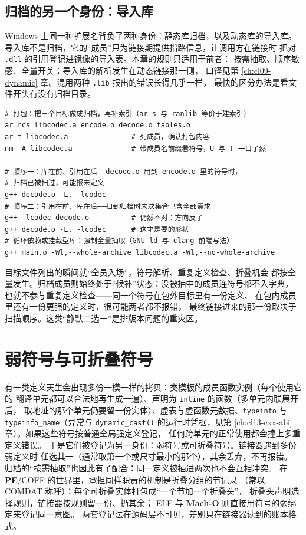\documentclass[12pt,a4paper,fontset=fandol]{ctexbook}
\newcommand{\Fn}[1]{\texttt{#1()}}
\newcommand{\Tp}[1]{\texttt{#1}}
\newcommand{\Sw}[1]{\texttt{#1}}
\newcommand{\Mx}[1]{\textsf{#1}}
\newcommand{\PeFmt}{\textbf{\textsf{PE}}}
\newcommand{\Macho}{\textbf{\textsf{Mach-O}}}
\newcommand{\Win}{\textsf{Windows}}
\begin{document}
\subsection{归档的另一个身份：导入库}\label{sec:cl08-importlib}

\Win{} 上同一种扩展名背负了两种身份：静态库归档，以及动态库的导入库。
导入库不是归档，它的“成员”只为链接期提供指路信息，让调用方在链接时
把对 \Tp{.dll} 的引用登记进镜像的导入表。本章的规则只适用于前者：
按需抽取、顺序敏感、全量开关；导入库的解析发生在动态链接那一侧，
口径见第 \ref{ch:cl09-dynamic} 章。混用两种 \Tp{.lib} 报出的错误长得几乎一样，
最快的区分办法是看文件开头有没有归档目录。

\begin{lstlisting}[style=shellstyle, caption={归档的创建与两种链接顺序（示意流程）}]
# 打包：把三个目标做成归档，再补索引（ar s 与 ranlib 等价于建索引）
ar rcs libcodec.a encode.o decode.o tables.o
ar t libcodec.a               # 列成员，确认打包内容
nm -A libcodec.a              # 带成员名前缀看符号，U 与 T 一目了然

# 顺序一：库在前、引用在后——decode.o 用到 encode.o 里的符号时，
# 归档已被扫过，可能报未定义
g++ decode.o -L. -lcodec
# 顺序二：引用在前、库在后——扫到归档时未决集合已含全部需求
g++ -lcodec decode.o          # 仍然不对：方向反了
g++ decode.o -L. -lcodec      # 这才是要的形状
# 循环依赖或挂载型库：强制全量抽取（GNU ld 与 clang 前端写法）
g++ main.o -Wl,--whole-archive libcodec.a -Wl,--no-whole-archive
\end{lstlisting}

\begin{compare}[title={目标文件与归档成员，谁进解析集合}]
目标文件列出的瞬间就“全员入场”，符号解析、重复定义检查、折叠机会
都按全量发生。归档成员则始终处于“候补”状态：没被抽中的成员连符号都不入字典，
也就不参与重复定义检查——同一个符号在包外目标里有一份定义、
在包内成员里还有一份更强的定义时，很可能两者都不报错，
最终链接进来的那一份取决于扫描顺序。这类“静默二选一”是排版本问题的重灾区。
\end{compare}

\section{弱符号与可折叠符号}\label{sec:cl08-weak}

有一类定义天生会出现多份一模一样的拷贝：类模板的成员函数实例（每个使用它的
翻译单元都可以合法地再生成一遍）、声明为 \Sw{inline} 的函数（多单元内联展开后，
取地址的那个单元仍要留一份实体）、虚表与虚函数元数据、\Sw{typeinfo} 与
\Sw{typeinfo\_name}（异常与 \Fn{dynamic\_cast} 的运行时凭据，见第
\ref{ch:cl13-cxx-abi} 章）。如果这些符号按普通全局强定义登记，
任何跨单元的正常使用都会撞上多重定义错误。
于是它们被登记为另一身份：弱符号或可折叠符号。链接器遇到多份弱定义时
任选其一（通常取第一个或尺寸最小的那个），其余丢弃，不再报错。
归档的“按需抽取”也因此有了配合：同一定义被抽进两次也不会互相冲突。
在 \PeFmt{}/COFF 的世界里，承担同样职责的机制是折叠分组的节记录
（常以 \Mx{COMDAT} 称呼）：每个可折叠实体打包成“一个节加一个折叠头”，
折叠头声明选择规则，链接器按规则留一份、扔其余；
\Mx{ELF} 与 \Macho{} 则直接用符号的弱绑定来登记同一意图。
两套登记法在源码层不可见，差别只在链接器读到的账本格式。
\end{document}
